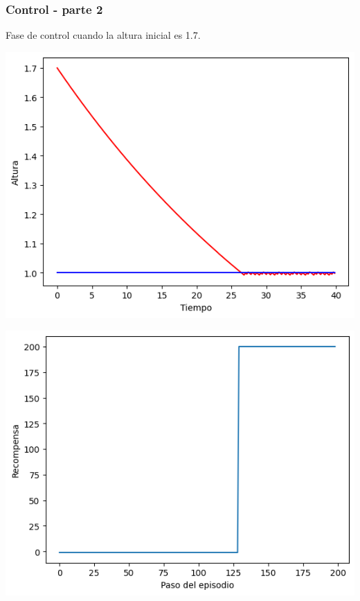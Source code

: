 \documentclass{beamer}
\begin{document}
\begin{frame}
\frametitle{Control - parte 2}

Fase de control cuando la altura inicial es 1.7.

\begin{center}
\includegraphics[scale=0.31]{altura_tiempo_p2.png}

\includegraphics[scale=0.31]{recompensa_pasos_p2.png}
\end{center}

\end{frame}
\end{document}
